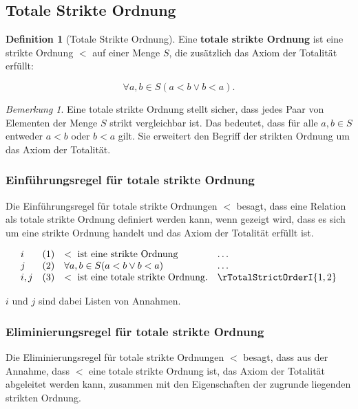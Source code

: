 \documentclass{book}
\theoremstyle{plain}
\theoremstyle{remark}
\newtheorem*{remark}{Bemerkung}
\theoremstyle{definition}
\newtheorem{definition}{Definition}[section]
\begin{document}
\subsection{Totale Strikte Ordnung}

\begin{definition}[Totale Strikte Ordnung]
    Eine \textbf{totale strikte Ordnung} ist eine strikte Ordnung \(<\) auf einer Menge \(S\), die zusätzlich das Axiom der Totalität erfüllt:
    
    \[
    \forall a, b \in S (a < b \lor b < a).
    \]
\end{definition}

\begin{remark}
    Eine totale strikte Ordnung stellt sicher, dass jedes Paar von Elementen der Menge \(S\) strikt vergleichbar ist. Das bedeutet, dass für alle \(a, b \in S\) entweder \(a < b\) oder \(b < a\) gilt. Sie erweitert den Begriff der strikten Ordnung um das Axiom der Totalität.
\end{remark}

\subsubsection*{Einführungsregel für totale strikte Ordnung}
\label{rule:rTotalStrictOrderI}
Die Einführungsregel für totale strikte Ordnungen \(<\) besagt, dass eine Relation als totale strikte Ordnung definiert werden kann, wenn gezeigt wird, dass es sich um eine strikte Ordnung handelt und das Axiom der Totalität erfüllt ist.

\[
\begin{array}{llll}
    i       & (1) & < \text{ ist eine strikte Ordnung} & \dots \\
    j       & (2) & \forall a, b \in S (a < b \lor b < a) & \dots \\
    i,j     & (3) & < \text{ ist eine totale strikte Ordnung.} & \rTotalStrictOrderI{1,2}
\end{array}
\]

\(i\) und \(j\) sind dabei Listen von Annahmen.

\subsubsection*{Eliminierungsregel für totale strikte Ordnung}
\label{rule:rTotalStrictOrderE}
Die Eliminierungsregel für totale strikte Ordnungen \(<\) besagt, dass aus der Annahme, dass \(<\) eine totale strikte Ordnung ist, das Axiom der Totalität abgeleitet werden kann, zusammen mit den Eigenschaften der zugrunde liegenden strikten Ordnung.
\end{document}
